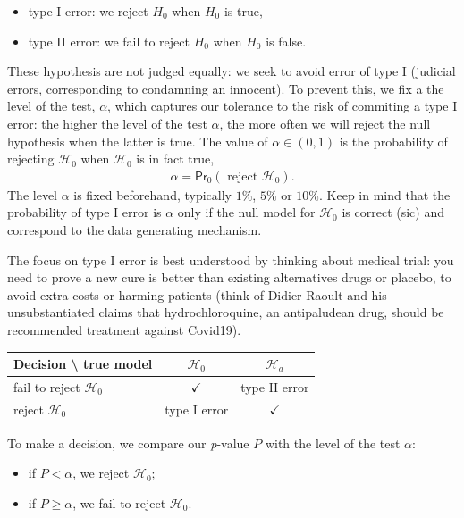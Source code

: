 \documentclass[
  11pt,
  letterpaper,
]{book}
\providecommand{\tightlist}{%
  \setlength{\itemsep}{0pt}\setlength{\parskip}{0pt}}
\theoremstyle{definition}
\theoremstyle{definition}
\theoremstyle{definition}
\theoremstyle{remark}
\begin{document}
\begin{itemize}
\tightlist
\item
  type I error: we reject \(H_0\) when \(H_0\) is true,
\item
  type II error: we fail to reject \(H_0\) when \(H_0\) is false.
\end{itemize}

These hypothesis are not judged equally: we seek to avoid error of type I (judicial errors, corresponding to condamning an innocent). To prevent this, we fix a the level of the test, \(\alpha\), which captures our tolerance to the risk of commiting a type I error: the higher the level of the test \(\alpha\), the more often we will reject the null hypothesis when the latter is true. The value of \(\alpha \in (0, 1)\) is the probability of rejecting \(\mathscr{H}_0\) when \(\mathscr{H}_0\) is in fact true,
\begin{align*}
\alpha = \mathsf{Pr}_0\left(\text{ reject } \mathscr{H}_0\right).
\end{align*}
The level \(\alpha\) is fixed beforehand, typically \(1\)\%, \(5\)\% or \(10\)\%. Keep in mind that the probability of type I error is \(\alpha\) only if the null model for \(\mathscr{H}_0\) is correct (sic) and correspond to the data generating mechanism.

The focus on type I error is best understood by thinking about medical trial: you need to prove a new cure is better than existing alternatives drugs or placebo, to avoid extra costs or harming patients (think of Didier Raoult and his unsubstantiated claims that hydrochloroquine, an antipaludean drug, should be recommended treatment against Covid19).

\begin{longtable}[]{@{}lcc@{}}
\toprule
\textbf{Decision} \textbackslash{} \textbf{true model} & \(\mathscr{H}_0\) & \(\mathscr{H}_a\)\tabularnewline
\midrule
\endhead
fail to reject \(\mathscr{H}_0\) & \(\checkmark\) & type II error\tabularnewline
reject \(\mathscr{H}_0\) & type I error & \(\checkmark\)\tabularnewline
\bottomrule
\end{longtable}

To make a decision, we compare our \emph{p}-value \(P\) with the level of the test \(\alpha\):

\begin{itemize}
\tightlist
\item
  if \(P < \alpha\), we reject \(\mathscr{H}_0\);
\item
  if \(P \geq \alpha\), we fail to reject \(\mathscr{H}_0\).
\end{itemize}
\end{document}
